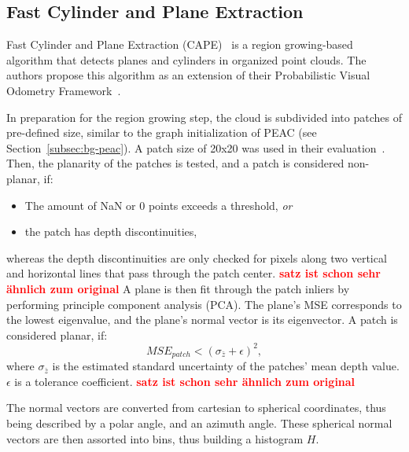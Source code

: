 \documentclass[main.tex]{subfiles}
\begin{document}
\subsection{Fast Cylinder and Plane Extraction}
Fast Cylinder and Plane Extraction (CAPE)~\cite{Proença_Gao_2018} is a region growing-based algorithm that detects
planes and cylinders in organized point clouds.
The authors propose this algorithm as an extension of their Probabilistic Visual Odometry Framework~\cite{Proenca_Gao_2018}.

In preparation for the region growing step, the cloud is subdivided into patches of pre-defined size, similar to
the graph initialization of PEAC (see Section~\ref{subsec:bg-peac}).
A patch size of 20x20 was used in their evaluation~\cite[Section~V.A]{Proença_Gao_2018}.
Then, the planarity of the patches is tested, and a patch is considered non-planar, if:
\begin{itemize}
    \item The amount of NaN or 0 points exceeds a threshold, \textit{or}
    \item the patch has depth discontinuities,
\end{itemize}
whereas the depth discontinuities are only checked for pixels along two vertical and horizontal lines that pass through
the patch center. \textbf{\textcolor{red}{satz ist schon sehr ähnlich zum original}}
A plane is then fit through the patch inliers by performing principle component analysis (PCA). The plane's MSE
corresponds to the lowest eigenvalue, and the plane's normal vector is its eigenvector.
A patch is considered planar, if:
\begin{equation}
    MSE_{patch} < (\sigma_{\bar{z}} + \epsilon)^2,
\end{equation}
where $\sigma_{\bar{z}}$ is the estimated standard uncertainty of the patches' mean depth value. $\epsilon$ is a
tolerance coefficient. \textbf{\textcolor{red}{satz ist schon sehr ähnlich zum original}}

The normal vectors are converted from cartesian to spherical coordinates, thus being described by a polar angle, and
an azimuth angle. These spherical normal vectors are then assorted into bins, thus building a histogram $H$.
\end{document}
